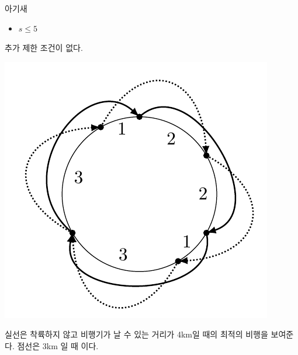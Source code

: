 \begin{problem}{아기새}
	\begin{itemize}
		\item $s \le 5$
	\end{itemize}
	
	추가 제한 조건이 없다.
	
	
	
	\Examples
	
	\begin{example}
\end{example}

\Note
\includegraphics[]{doo.png}

실선은 착륙하지 않고 비행기가 날 수 있는 거리가 4km일 때의 최적의 비행을 보여준다. 점선은 3km 일 때 이다.
\end{problem}

